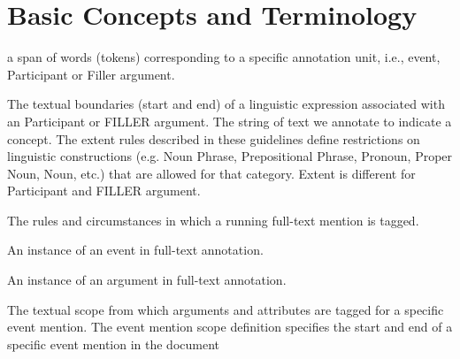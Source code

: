 \section{Basic Concepts and Terminology}
\begin{description}[noitemsep]
    \item[Mention] a span of words (tokens) corresponding to a specific annotation unit, i.e., event, Participant or Filler argument.
    \item[Extent] The textual boundaries (start and end) of a linguistic expression associated with an Participant or FILLER argument.
    The string of text we annotate to indicate a concept.
    The extent rules described in these guidelines define restrictions on linguistic constructions (e.g. Noun Phrase, Prepositional Phrase, Pronoun, Proper Noun, Noun, etc.) that are allowed for that category.
    Extent is different for Participant and FILLER argument.
    \item[Taggability] The rules and circumstances in which a running full-text mention is tagged.
    \item[Event mention] An instance of an event in full-text annotation.
    \item[Argument mention] An instance of an argument in full-text annotation.
    \item[Event mention scope] The textual scope from which arguments and attributes are tagged for a specific event mention.
    The event mention scope definition specifies the start and end of a specific event mention in the document 
    \item[FILLER argument] 
    \item[Participant argument] 
\end{description}

